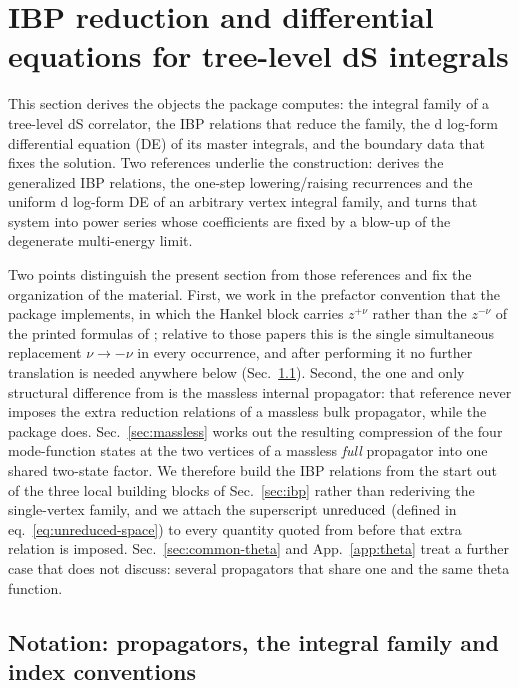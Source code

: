\documentclass[11pt,a4paper]{article}
\begin{document}
\section{IBP reduction and differential equations for tree-level dS integrals}
\label{sec:method}

This section derives the objects the package computes: the integral family of a tree-level dS
correlator, the IBP relations that reduce the family, the d log-form differential equation (DE) of
its master integrals, and the boundary data that fixes the solution. Two references underlie the
construction: \cite{Chen:2023iix} derives the generalized IBP relations, the one-step
lowering/raising recurrences and the uniform d log-form DE of an arbitrary vertex integral family,
and \cite{Chen:2024glu} turns that system into power series whose coefficients are fixed by a
blow-up of the degenerate multi-energy limit.

Two points distinguish the present section from those references and fix the organization of the
material. First, we work in the prefactor convention that the package implements, in which the
Hankel block carries $z^{+\nu}$ rather than the $z^{-\nu}$ of the printed formulas of
\cite{Chen:2023iix,Chen:2024glu}; relative to those papers this is the single simultaneous
replacement $\nu\to-\nu$ in every occurrence, and after performing it no further translation is
needed anywhere below (Sec.~\ref{sec:notation}). Second, the one and only structural difference
from \cite{Chen:2023iix} is the massless internal propagator: that reference never imposes the
extra reduction relations of a massless bulk propagator, while the package does.
Sec.~\ref{sec:massless} works out the resulting compression of the four mode-function states at the
two vertices of a massless \emph{full} propagator into one shared two-state factor. We therefore
build the IBP relations from the start out of the three local building
blocks of Sec.~\ref{sec:ibp} rather than rederiving the single-vertex family, and we attach the
superscript ${\rm unreduced}$ (defined in eq.~\eqref{eq:unreduced-space}) to every quantity quoted
from \cite{Chen:2023iix} before that extra relation is imposed. Sec.~\ref{sec:common-theta} and
App.~\ref{app:theta} treat a further case that \cite{Chen:2023iix} does not discuss: several
propagators that share one and the same theta function.

\subsection{Notation: propagators, the integral family and index conventions}
\label{sec:notation}
\label{sec:conventions}
\end{document}
